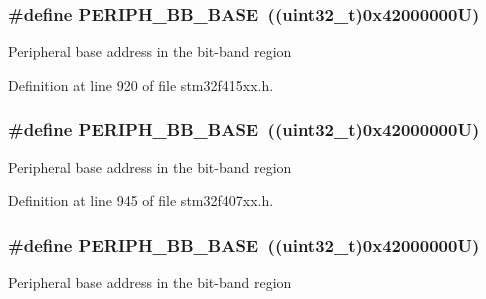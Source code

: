 \subsubsection[{\texorpdfstring{P\+E\+R\+I\+P\+H\+\_\+\+B\+B\+\_\+\+B\+A\+SE}{PERIPH_BB_BASE}}]{\setlength{\rightskip}{0pt plus 5cm}\#define P\+E\+R\+I\+P\+H\+\_\+\+B\+B\+\_\+\+B\+A\+SE~((uint32\+\_\+t)0x42000000\+U)}\hypertarget{group___peripheral__registers__structures_gaed7efc100877000845c236ccdc9e144a}{}\label{group___peripheral__registers__structures_gaed7efc100877000845c236ccdc9e144a}
Peripheral base address in the bit-\/band region 

Definition at line 920 of file stm32f415xx.\+h.

\subsubsection[{\texorpdfstring{P\+E\+R\+I\+P\+H\+\_\+\+B\+B\+\_\+\+B\+A\+SE}{PERIPH_BB_BASE}}]{\setlength{\rightskip}{0pt plus 5cm}\#define P\+E\+R\+I\+P\+H\+\_\+\+B\+B\+\_\+\+B\+A\+SE~((uint32\+\_\+t)0x42000000\+U)}\hypertarget{group___peripheral__registers__structures_gaed7efc100877000845c236ccdc9e144a}{}\label{group___peripheral__registers__structures_gaed7efc100877000845c236ccdc9e144a}
Peripheral base address in the bit-\/band region 

Definition at line 945 of file stm32f407xx.\+h.

\subsubsection[{\texorpdfstring{P\+E\+R\+I\+P\+H\+\_\+\+B\+B\+\_\+\+B\+A\+SE}{PERIPH_BB_BASE}}]{\setlength{\rightskip}{0pt plus 5cm}\#define P\+E\+R\+I\+P\+H\+\_\+\+B\+B\+\_\+\+B\+A\+SE~((uint32\+\_\+t)0x42000000\+U)}\hypertarget{group___peripheral__registers__structures_gaed7efc100877000845c236ccdc9e144a}{}\label{group___peripheral__registers__structures_gaed7efc100877000845c236ccdc9e144a}
Peripheral base address in the bit-\/band region 

